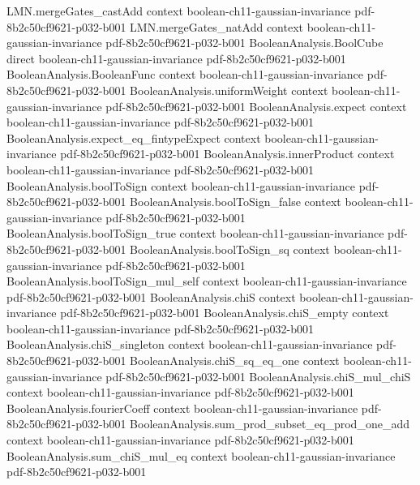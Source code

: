 \begin{theorem}
  {LMN.mergeGates_castAdd}
  {context}
  {boolean-ch11-gaussian-invariance}
  {pdf-8b2c50cf9621-p032-b001}
\proofstep
  {LMN.mergeGates_natAdd}
  {context}
  {boolean-ch11-gaussian-invariance}
  {pdf-8b2c50cf9621-p032-b001}
\proofstep
  {BooleanAnalysis.BoolCube}
  {direct}
  {boolean-ch11-gaussian-invariance}
  {pdf-8b2c50cf9621-p032-b001}
\proofstep
  {BooleanAnalysis.BooleanFunc}
  {context}
  {boolean-ch11-gaussian-invariance}
  {pdf-8b2c50cf9621-p032-b001}
\proofstep
  {BooleanAnalysis.uniformWeight}
  {context}
  {boolean-ch11-gaussian-invariance}
  {pdf-8b2c50cf9621-p032-b001}
\proofstep
  {BooleanAnalysis.expect}
  {context}
  {boolean-ch11-gaussian-invariance}
  {pdf-8b2c50cf9621-p032-b001}
\proofstep
  {BooleanAnalysis.expect_eq_fintypeExpect}
  {context}
  {boolean-ch11-gaussian-invariance}
  {pdf-8b2c50cf9621-p032-b001}
\proofstep
  {BooleanAnalysis.innerProduct}
  {context}
  {boolean-ch11-gaussian-invariance}
  {pdf-8b2c50cf9621-p032-b001}
\proofstep
  {BooleanAnalysis.boolToSign}
  {context}
  {boolean-ch11-gaussian-invariance}
  {pdf-8b2c50cf9621-p032-b001}
\proofstep
  {BooleanAnalysis.boolToSign_false}
  {context}
  {boolean-ch11-gaussian-invariance}
  {pdf-8b2c50cf9621-p032-b001}
\proofstep
  {BooleanAnalysis.boolToSign_true}
  {context}
  {boolean-ch11-gaussian-invariance}
  {pdf-8b2c50cf9621-p032-b001}
\proofstep
  {BooleanAnalysis.boolToSign_sq}
  {context}
  {boolean-ch11-gaussian-invariance}
  {pdf-8b2c50cf9621-p032-b001}
\proofstep
  {BooleanAnalysis.boolToSign_mul_self}
  {context}
  {boolean-ch11-gaussian-invariance}
  {pdf-8b2c50cf9621-p032-b001}
\proofstep
  {BooleanAnalysis.chiS}
  {context}
  {boolean-ch11-gaussian-invariance}
  {pdf-8b2c50cf9621-p032-b001}
\proofstep
  {BooleanAnalysis.chiS_empty}
  {context}
  {boolean-ch11-gaussian-invariance}
  {pdf-8b2c50cf9621-p032-b001}
\proofstep
  {BooleanAnalysis.chiS_singleton}
  {context}
  {boolean-ch11-gaussian-invariance}
  {pdf-8b2c50cf9621-p032-b001}
\proofstep
  {BooleanAnalysis.chiS_sq_eq_one}
  {context}
  {boolean-ch11-gaussian-invariance}
  {pdf-8b2c50cf9621-p032-b001}
\proofstep
  {BooleanAnalysis.chiS_mul_chiS}
  {context}
  {boolean-ch11-gaussian-invariance}
  {pdf-8b2c50cf9621-p032-b001}
\proofstep
  {BooleanAnalysis.fourierCoeff}
  {context}
  {boolean-ch11-gaussian-invariance}
  {pdf-8b2c50cf9621-p032-b001}
\proofstep
  {BooleanAnalysis.sum_prod_subset_eq_prod_one_add}
  {context}
  {boolean-ch11-gaussian-invariance}
  {pdf-8b2c50cf9621-p032-b001}
\proofstep
  {BooleanAnalysis.sum_chiS_mul_eq}
  {context}
  {boolean-ch11-gaussian-invariance}
  {pdf-8b2c50cf9621-p032-b001}

\end{theorem}
